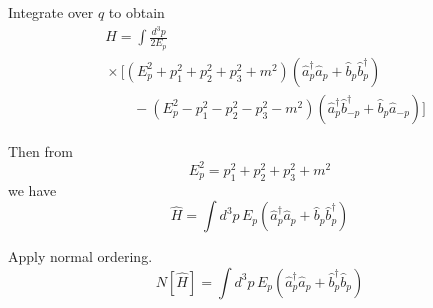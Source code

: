 \documentclass[12pt]{article}
\begin{document}
Integrate over $q$ to obtain
\begin{align*}
&\hat H=\int\frac{d^3p}{2E_p}
\\
&{}\times\bigg[(E_p^2+p_1^2+p_2^2+p_3^2+m^2)
\left(\hat a_p^\dag\hat a_p+\hat b_p\hat b_p^\dag\right)
\\
&\qquad{}-(E_p^2-p_1^2-p_2^2-p_3^2-m^2)
\left(\hat a_p^\dag\hat b_{-p}^\dag+\hat b_p\hat a_{-p}\right)\bigg]
\end{align*}

Then from
\begin{equation*}
E_p^2=p_1^2+p_2^2+p_3^2+m^2
\end{equation*}
we have
\begin{equation*}
\hat H=\int d^3p\,E_p\left(\hat a_p^\dag\hat a_p+\hat b_p\hat b_p^\dag\right)
\end{equation*}

Apply normal ordering.
\begin{equation*}
N[\hat H]=\int d^3p\,E_p\left(\hat a_p^\dag\hat a_p+\hat b_p^\dag\hat b_p\right)
\end{equation*}
\end{document}
